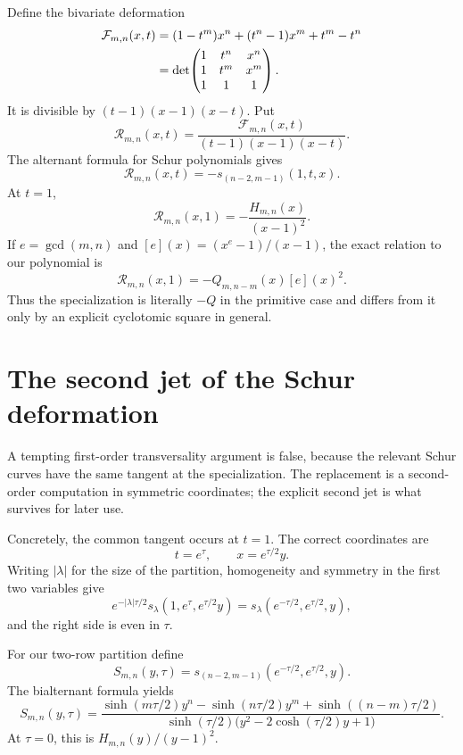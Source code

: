 \documentclass[11pt]{article}
\numberwithin{equation}{section}
\theoremstyle{definition}
\begin{document}
Define the bivariate deformation
\begin{align}
 \mathcal F_{m,n}(x,t)
 &=(1-t^m)x^n+(t^n-1)x^m+t^m-t^n  \notag\\
 &=\det\!\begin{pmatrix}
 1&t^n&x^n\\
 1&t^m&x^m\\
 1&1&1
 \end{pmatrix}.
 \label{eq:8-1}
\end{align}
It is divisible by \((t-1)(x-1)(x-t)\).  Put
\[
 \mathcal R_{m,n}(x,t)=
 \frac{\mathcal F_{m,n}(x,t)}{(t-1)(x-1)(x-t)}.
\]
The alternant formula for Schur polynomials gives
\begin{equation}
 \mathcal R_{m,n}(x,t)
 =-s_{(n-2,m-1)}(1,t,x).
 \label{eq:8-2}
\end{equation}
At \(t=1\),
\begin{equation}
 \mathcal R_{m,n}(x,1)
 =-\frac{H_{m,n}(x)}{(x-1)^2}.
 \label{eq:8-3}
\end{equation}
If \(e=\gcd(m,n)\) and \([e](x)=(x^e-1)/(x-1)\), the exact relation to our
polynomial is
\begin{equation}
 \mathcal R_{m,n}(x,1)
 =-Q_{m,n-m}(x)[e](x)^2.
 \label{eq:8-4}
\end{equation}
Thus the specialization is literally \(-Q\) in the primitive case and differs
from it only by an explicit cyclotomic square in general.

\section{The second jet of the Schur deformation}
\label{sec:secondjet}

A tempting first-order transversality argument is false, because the relevant Schur curves have the same tangent at the specialization.  The replacement is a second-order computation in symmetric coordinates; the explicit second jet is what survives for later use.

Concretely, the common tangent occurs at \(t=1\).  The correct coordinates are
\[
 t=e^\tau,
 \qquad
 x=e^{\tau/2}y.
\]
Writing $|\lambda|$ for the size of the partition, homogeneity and symmetry
in the first two variables give
\[
 e^{-|\lambda|\tau/2}s_\lambda(1,e^\tau,e^{\tau/2}y)
 =s_\lambda(e^{-\tau/2},e^{\tau/2},y),
\]
and the right side is even in \(\tau\).

For our two-row partition define
\[
 S_{m,n}(y,\tau)
 =s_{(n-2,m-1)}(e^{-\tau/2},e^{\tau/2},y).
\]
The bialternant formula yields
\begin{equation}
 S_{m,n}(y,\tau)=
 \frac{
 \sinh(m\tau/2)y^n-
 \sinh(n\tau/2)y^m+
 \sinh((n-m)\tau/2)
 }{
 \sinh(\tau/2)
 \bigl(y^2-2\cosh(\tau/2)y+1\bigr)
 }.
 \label{eq:9-1}
\end{equation}
At \(\tau=0\), this is \(H_{m,n}(y)/(y-1)^2\).
\end{document}
